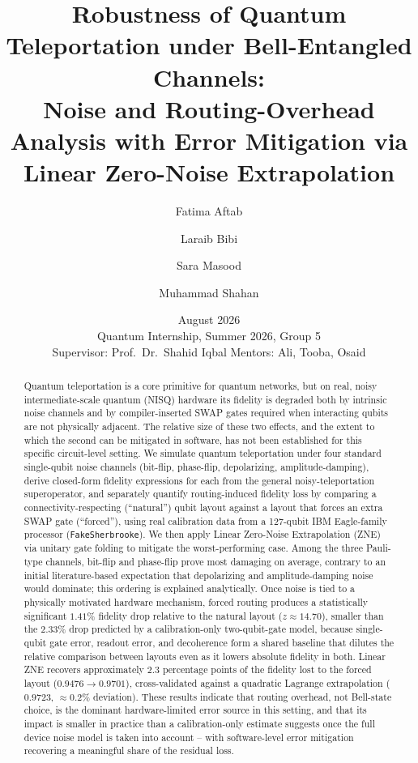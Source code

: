 \documentclass[11pt]{article}
\title{\textbf{Robustness of Quantum Teleportation under Bell-Entangled Channels:\\
Noise and Routing-Overhead Analysis with Error Mitigation via Linear Zero-Noise Extrapolation}}
\author[1]{Fatima Aftab}
\author[1]{Laraib Bibi}
\author[1]{Sara Masood}
\author[1]{Muhammad Shahan}
\affil[1]{School of Natural Sciences (SNS), National University of Sciences and Technology (NUST)}
\date{August 2026\\[0.3em]\normalsize Quantum Internship, Summer 2026, Group 5\\ Supervisor: Prof.\ Dr.\ Shahid Iqbal \quad Mentors: Ali, Tooba, Osaid}
\begin{document}
\maketitle

\begin{abstract}
\noindent
Quantum teleportation is a core primitive for quantum networks, but on real, noisy intermediate-scale quantum (NISQ) hardware its fidelity is degraded both by intrinsic noise channels and by compiler-inserted SWAP gates required when interacting qubits are not physically adjacent. The relative size of these two effects, and the extent to which the second can be mitigated in software, has not been established for this specific circuit-level setting. We simulate quantum teleportation under four standard single-qubit noise channels (bit-flip, phase-flip, depolarizing, amplitude-damping), derive closed-form fidelity expressions for each from the general noisy-teleportation superoperator, and separately quantify routing-induced fidelity loss by comparing a connectivity-respecting (``natural'') qubit layout against a layout that forces an extra SWAP gate (``forced''), using real calibration data from a 127-qubit IBM Eagle-family processor (\texttt{FakeSherbrooke}). We then apply Linear Zero-Noise Extrapolation (ZNE) via unitary gate folding to mitigate the worst-performing case. Among the three Pauli-type channels, bit-flip and phase-flip prove most damaging on average, contrary to an initial literature-based expectation that depolarizing and amplitude-damping noise would dominate; this ordering is explained analytically. Once noise is tied to a physically motivated hardware mechanism, forced routing produces a statistically significant $1.41\%$ fidelity drop relative to the natural layout ($z\approx14.70$), smaller than the $2.33\%$ drop predicted by a calibration-only two-qubit-gate model, because single-qubit gate error, readout error, and decoherence form a shared baseline that dilutes the relative comparison between layouts even as it lowers absolute fidelity in both. Linear ZNE recovers approximately $2.3$ percentage points of the fidelity lost to the forced layout ($0.9476\to0.9701$), cross-validated against a quadratic Lagrange extrapolation ($0.9723$, $\approx0.2\%$ deviation). These results indicate that routing overhead, not Bell-state choice, is the dominant hardware-limited error source in this setting, and that its impact is smaller in practice than a calibration-only estimate suggests once the full device noise model is taken into account -- with software-level error mitigation recovering a meaningful share of the residual loss.
\end{abstract}
\end{document}
